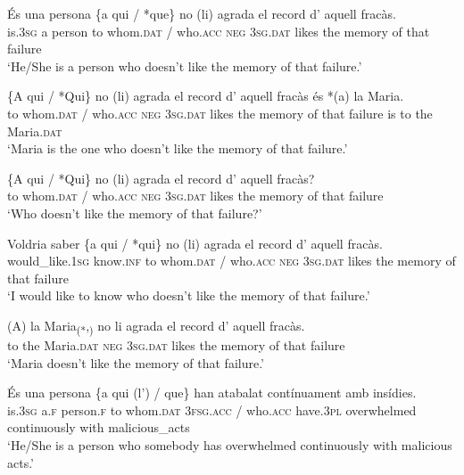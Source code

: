 \documentclass[output=paper,colorlinks,citecolor=brown,modfonts,nonflat]{langsci/langscibook}
\begin{document}
{{ 

\ea%
 \label{ex:royo:15}
 
 \ea\label{ex:royo:15a} 
 \gll És una persona \{a qui / *que\} no (li) agrada el record d’ aquell fracàs.\\
 is.\textsc{3sg}  a person to whom.\textsc{dat} / who.\textsc{acc} \textsc{neg} \textsc{3sg.dat} likes the memory of that failure\\
\glt ‘He/She is a person who doesn’t like the memory of that failure.’
 
 \ex \label{ex:royo:15b}
 \gll  \{A qui / *Qui\} no (li) agrada el record d’ aquell fracàs és *(a) la Maria.\\
  to whom.\textsc{dat} / who.\textsc{acc} \textsc{neg} \textsc{3sg.dat} likes the memory of that failure is to the Maria.\textsc{dat}\\
\glt ‘Maria is the one who doesn’t like the memory of that failure.’
 
 
 
 \ex \label{ex:royo:15c}
 \gll \{A qui / *Qui\} no (li) agrada el record d’ aquell fracàs?\\
 to whom.\textsc{dat} / who.\textsc{acc} \textsc{neg} \textsc{3sg.dat} likes the memory of that failure\\
\glt ‘Who doesn’t like the memory of that failure?’ 
 
 \ex \label{ex:royo:15d}
 \gll Voldria saber \{a qui / *qui\} no (li) agrada el record d’ aquell fracàs.\\
 would\_like.\textsc{1sg} know.\textsc{inf} to whom.\textsc{dat} / who.\textsc{acc} \textsc{neg} \textsc{3sg.dat} likes the memory of that failure\\
\glt ‘I would like to know who doesn’t like the memory of that failure.’
 
 \ex \label{ex:royo:15e}
 \gll *(A) la Maria\textsubscript{(*},\textsubscript{)} no li agrada el record d’ aquell fracàs.\\
 to the Maria.\textsc{dat} \textsc{neg} \textsc{3sg.dat} likes the memory of that failure\\
\glt ‘Maria doesn’t like the memory of that failure.’
 
 \z
 \z

 
\ea%
 \label{ex:royo:16}
 \ea \label{ex:royo:16a}
 \gll És una persona \{a qui (l’) / que\} han atabalat contínuament amb insídies.\\
 is.\textsc{3sg} a.\textsc{f}  person.\textsc{f} to whom.\textsc{dat} \textsc{3fsg.acc} / who.\textsc{acc} have.\textsc{3pl} overwhelmed continuously with malicious\_acts\\
\glt ‘He/She is a person who somebody has overwhelmed continuously with malicious acts.’
 
}}
\end{document}

